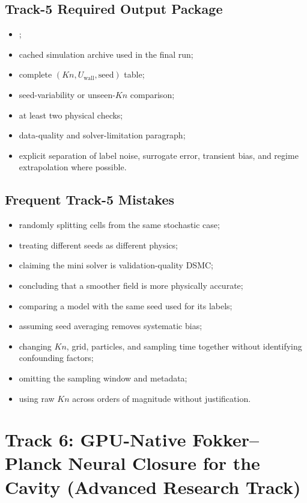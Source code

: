 \documentclass[11pt]{article}
\newcommand{\file}[1]{\path{#1}}
\begin{document}
\subsection{Track-5 Required Output Package}
\begin{itemize}
\item \file{P5_results.csv};
\item cached simulation archive used in the final run;
\item complete $(Kn,U_{\mathrm{wall}},\mathrm{seed})$ table;
\item seed-variability or unseen-$Kn$ comparison;
\item at least two physical checks;
\item data-quality and solver-limitation paragraph;
\item explicit separation of label noise, surrogate error, transient bias, and regime extrapolation where possible.
\end{itemize}

\subsection{Frequent Track-5 Mistakes}
\begin{itemize}
\item randomly splitting cells from the same stochastic case;
\item treating different seeds as different physics;
\item claiming the mini solver is validation-quality DSMC;
\item concluding that a smoother field is more physically accurate;
\item comparing a model with the same seed used for its labels;
\item assuming seed averaging removes systematic bias;
\item changing $Kn$, grid, particles, and sampling time together without identifying confounding factors;
\item omitting the sampling window and metadata;
\item using raw $Kn$ across orders of magnitude without justification.
\end{itemize}


\clearpage
\section{Track 6: GPU-Native Fokker--Planck Neural Closure for the Cavity (Advanced Research Track)}
\end{document}
